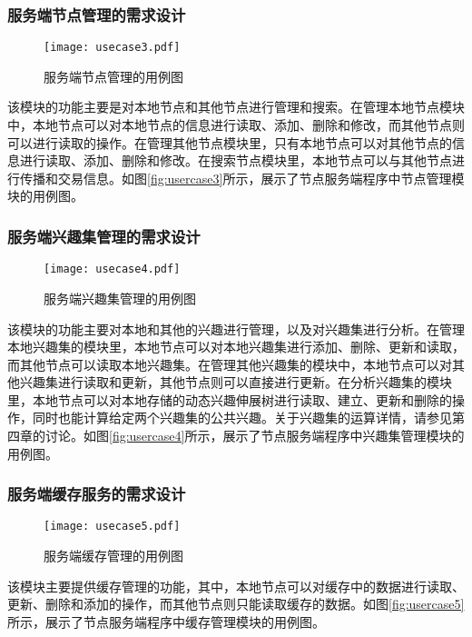 \subsubsection{服务端节点管理的需求设计}
\begin{figure}[!ht]
\centering
\texttt{[image: usecase3.pdf]}
\caption{服务端节点管理的用例图}
\label{fig:usecase3}
\end{figure}

该模块的功能主要是对本地节点和其他节点进行管理和搜索。在管理本地节点模块中，本地节点可以对本地节点的信息进行读取、添加、删除和修改，而其他节点则可以进行读取的操作。在管理其他节点模块里，只有本地节点可以对其他节点的信息进行读取、添加、删除和修改。在搜索节点模块里，本地节点可以与其他节点进行传播和交易信息。如图\ref{fig:usercase3}所示，展示了节点服务端程序中节点管理模块的用例图。

\subsubsection{服务端兴趣集管理的需求设计}
\begin{figure}[!htb]
\centering
\texttt{[image: usecase4.pdf]}
\caption{服务端兴趣集管理的用例图}
\label{fig:usecase4}
\end{figure}

该模块的功能主要对本地和其他的兴趣进行管理，以及对兴趣集进行分析。在管理本地兴趣集的模块里，本地节点可以对本地兴趣集进行添加、删除、更新和读取，而其他节点可以读取本地兴趣集。在管理其他兴趣集的模块中，本地节点可以对其他兴趣集进行读取和更新，其他节点则可以直接进行更新。在分析兴趣集的模块里，本地节点可以对本地存储的动态兴趣伸展树进行读取、建立、更新和删除的操作，同时也能计算给定两个兴趣集的公共兴趣。关于兴趣集的运算详情，请参见第四章的讨论。如图\ref{fig:usercase4}所示，展示了节点服务端程序中兴趣集管理模块的用例图。


\subsubsection{服务端缓存服务的需求设计}
\begin{figure}[!htb]
\centering
\texttt{[image: usecase5.pdf]}
\caption{服务端缓存管理的用例图}
\label{fig:usecase5}
\end{figure}

该模块主要提供缓存管理的功能，其中，本地节点可以对缓存中的数据进行读取、更新、删除和添加的操作，而其他节点则只能读取缓存的数据。如图\ref{fig:usercase5}所示，展示了节点服务端程序中缓存管理模块的用例图。

